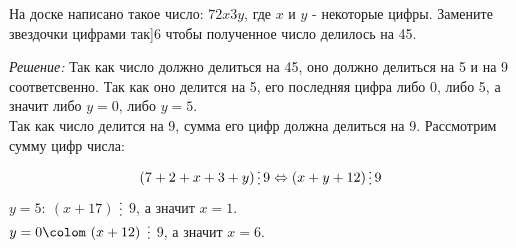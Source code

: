 \documentclass[11pt]{article}
\begin{document}
\begin{example}

	На доске написано  такое число: $72x3y$, где $x$ и $y$ - некоторые цифры. Замените звездочки цифрами так]6 чтобы полученное число делилось на 45.

\end{example}
\textit{Решение:}
Так как число должно делиться на 45, оно должно делиться на 5 и на 9 соответсвенно.
Так как оно делится на 5, его последняя цифра либо 0, либо 5, а значит либо $y = 0$, либо $y = 5$. \\
Так как число делится на 9, сумма его цифр должна делиться на 9. Рассмотрим сумму цифр числа:
\[ (7 + 2 + x + 3 + y) \divisible 9 \Leftrightarrow (x + y + 12) \divisible 9\]
$y = 5\colon \ (x + 17)$ $\divisible$ $9$, а значит $x = 1$.\\
$y = 0\colom \ (x + 12)$ $\divisible$ $9$, а значит $x = 6$.\\
\end{document}

